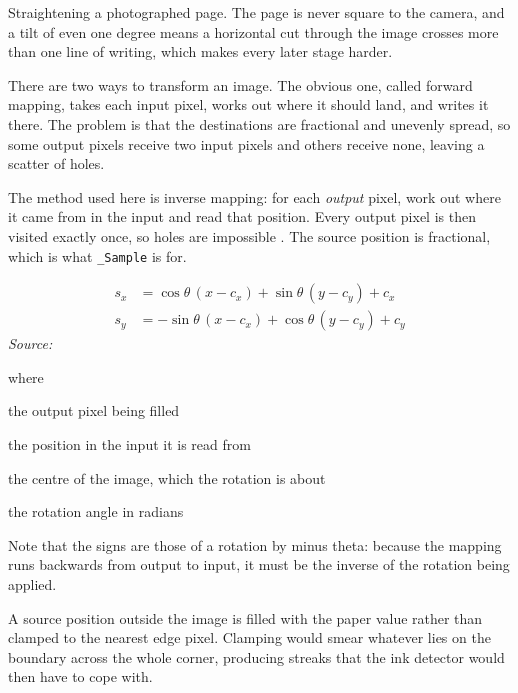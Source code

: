 Straightening a photographed page. The page is never square to the camera, and a tilt of even one degree means a horizontal cut through the image crosses more than one line of writing, which makes every later stage harder.


There are two ways to transform an image. The obvious one, called forward mapping, takes each input pixel, works out where it should land, and writes it there. The problem is that the destinations are fractional and unevenly spread, so some output pixels receive two input pixels and others receive none, leaving a scatter of holes.

The method used here is inverse mapping: for each \emph{output} pixel, work out where it came from in the input and read that position. Every output pixel is then visited exactly once, so holes are impossible \cite{wolberg1990}. The source position is fractional, which is what \texttt{\_Sample} is for.



\begin{equation}
\begin{aligned}s_x &= \cos\theta\,(x - c_x) + \sin\theta\,(y - c_y) + c_x \\s_y &= -\sin\theta\,(x - c_x) + \cos\theta\,(y - c_y) + c_y\end{aligned}
\end{equation}
\noindent\emph{Source: }\cite{wolberg1990}


\noindent where
\begin{description}[leftmargin=2.4em,style=nextline,font=\normalfont\ttfamily]\setlength\itemsep{1pt}
  \item[{$x,\, y$}] \normalfont the output pixel being filled
  \item[{$s_x,\, s_y$}] \normalfont the position in the input it is read from
  \item[{$c_x,\, c_y$}] \normalfont the centre of the image, which the rotation is about
  \item[{$\theta$}] \normalfont the rotation angle in radians
\end{description}
Note that the signs are those of a rotation by minus theta: because the mapping runs backwards from output to input, it must be the inverse of the rotation being applied.


A source position outside the image is filled with the paper value rather than clamped to the nearest edge pixel. Clamping would smear whatever lies on the boundary across the whole corner, producing streaks that the ink detector would then have to cope with.


